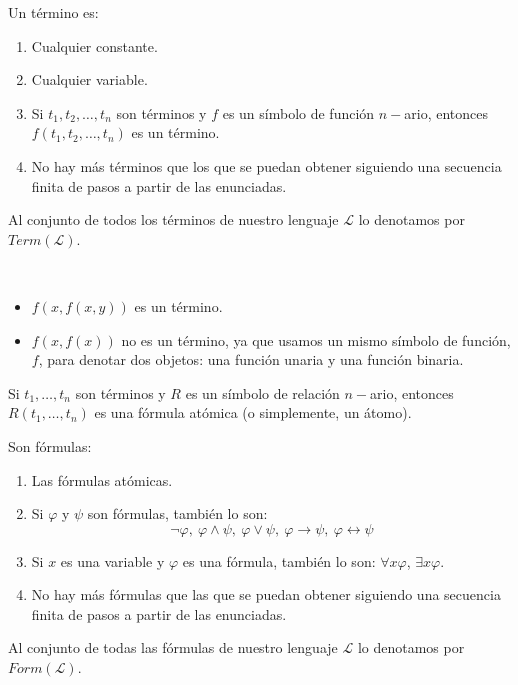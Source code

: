 \begin{definicion}[Término]
    Un término es:
    \begin{enumerate}
        \item Cualquier constante.
        \item Cualquier variable.
        \item Si $t_1,t_2,\ldots,t_n$ son términos y $f$ es un símbolo de función $n-$ario, entonces $f(t_1,t_2,\ldots,t_n)$ es un término.
        \item No hay más términos que los que se puedan obtener siguiendo una secuencia finita de pasos a partir de las enunciadas.
    \end{enumerate}
    Al conjunto de todos los términos de nuestro lenguaje $\mathcal{L}$ lo denotamos por $Term(\mathcal{L})$.
\end{definicion}

\begin{ejemplo}\
    \begin{itemize}
        \item $f(x,f(x,y))$ es un término.
        \item $f(x,f(x))$ no es un término, ya que usamos un mismo símbolo de función, $f$, para denotar dos objetos: una función unaria y una función binaria.
    \end{itemize}
\end{ejemplo}

\begin{definicion}
    Si $t_1,\ldots,t_n$ son términos y $R$ es un símbolo de relación $n-$ario, entonces $R(t_1,\ldots,t_n)$ es una fórmula atómica (o simplemente, un átomo).
\end{definicion}

\begin{definicion}[Fórmulas]
    Son fórmulas:
    \begin{enumerate}
        \item Las fórmulas atómicas.
        \item Si $\varphi$ y $\psi$ son fórmulas, también lo son:
            \begin{equation*}
                \lnot\varphi,\ \varphi\land\psi,\ \varphi\lor\psi,\ \varphi\to\psi,\ \varphi\leftrightarrow\psi
            \end{equation*}
        \item Si $x$ es una variable y $\varphi$ es una fórmula, también lo son: $\forall x\varphi$, $\exists x\varphi$.
        \item No hay más fórmulas que las que se puedan obtener siguiendo una secuencia finita de pasos a partir de las enunciadas.
    \end{enumerate}
    Al conjunto de todas las fórmulas de nuestro lenguaje $\mathcal{L}$ lo denotamos por $Form(\mathcal{L})$.
\end{definicion}

